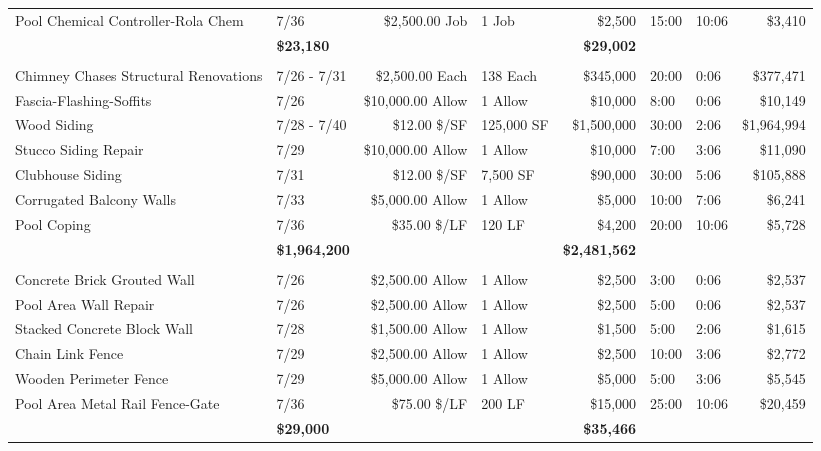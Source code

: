 \documentclass[11pt,letterpaper]{article}
\begin{document}
\begin{longtable}{p{5.1cm} p{1.6cm} r p{1.7cm} r p{1.0cm} p{1.2cm} r}
\rowcolor{blue!12} Pool Chemical Controller-Rola Chem & 7/36 & \$2,500.00 Job & 1 Job & \$2,500 & 15:00 & 10:06 & \$3,410 \\
\addlinespace[1pt] \multicolumn{4}{r}{} & \textbf{\$23,180} & & & \textbf{\$29,002} \\
\addlinespace[6pt]
\multicolumn{8}{l}{\textbf{Exterior Surfaces}} \\
\rowcolor{blue!12} Chimney Chases Structural Renovations & 7/26 - 7/31 & \$2,500.00 Each & 138 Each & \$345,000 & 20:00 & 0:06 & \$377,471 \\
Fascia-Flashing-Soffits & 7/26 & \$10,000.00 Allow & 1 Allow & \$10,000 & 8:00 & 0:06 & \$10,149 \\
\rowcolor{blue!12} Wood Siding & 7/28 - 7/40 & \$12.00 \$/SF & 125,000 SF & \$1,500,000 & 30:00 & 2:06 & \$1,964,994 \\
Stucco Siding Repair & 7/29 & \$10,000.00 Allow & 1 Allow & \$10,000 & 7:00 & 3:06 & \$11,090 \\
\rowcolor{blue!12} Clubhouse Siding & 7/31 & \$12.00 \$/SF & 7,500 SF & \$90,000 & 30:00 & 5:06 & \$105,888 \\
Corrugated Balcony Walls & 7/33 & \$5,000.00 Allow & 1 Allow & \$5,000 & 10:00 & 7:06 & \$6,241 \\
\rowcolor{blue!12} Pool Coping & 7/36 & \$35.00 \$/LF & 120 LF & \$4,200 & 20:00 & 10:06 & \$5,728 \\
\addlinespace[1pt] \multicolumn{4}{r}{} & \textbf{\$1,964,200} & & & \textbf{\$2,481,562} \\
\addlinespace[6pt]
\multicolumn{8}{l}{\textbf{Fences-Walls-Gates}} \\
\rowcolor{blue!12} Concrete Brick Grouted Wall & 7/26 & \$2,500.00 Allow & 1 Allow & \$2,500 & 3:00 & 0:06 & \$2,537 \\
Pool Area Wall Repair & 7/26 & \$2,500.00 Allow & 1 Allow & \$2,500 & 5:00 & 0:06 & \$2,537 \\
\rowcolor{blue!12} Stacked Concrete Block Wall & 7/28 & \$1,500.00 Allow & 1 Allow & \$1,500 & 5:00 & 2:06 & \$1,615 \\
Chain Link Fence & 7/29 & \$2,500.00 Allow & 1 Allow & \$2,500 & 10:00 & 3:06 & \$2,772 \\
\rowcolor{blue!12} Wooden Perimeter Fence & 7/29 & \$5,000.00 Allow & 1 Allow & \$5,000 & 5:00 & 3:06 & \$5,545 \\
Pool Area Metal Rail Fence-Gate & 7/36 & \$75.00 \$/LF & 200 LF & \$15,000 & 25:00 & 10:06 & \$20,459 \\
\addlinespace[1pt] \multicolumn{4}{r}{} & \textbf{\$29,000} & & & \textbf{\$35,466} \\

\end{longtable}
\end{document}
